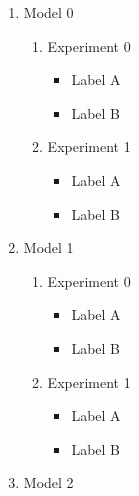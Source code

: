 \begin{enumerate}

\item Model 0

      \begin{enumerate}

      \item Experiment 0

            \begin{itemize}
	    \item Label A
	    \item Label B
	    \end{itemize}

      \item Experiment 1

            \begin{itemize}
	    \item Label A
	    \item Label B
	    \end{itemize}

      \end{enumerate}


\item Model 1

      \begin{enumerate}

      \item Experiment 0
            \begin{itemize}
	    \item Label A
	    \item Label B
	    \end{itemize}

      \item Experiment 1
            \begin{itemize}
	    \item Label A
	    \item Label B
	    \end{itemize}

      \end{enumerate}

\item Model 2


\end{enumerate}
